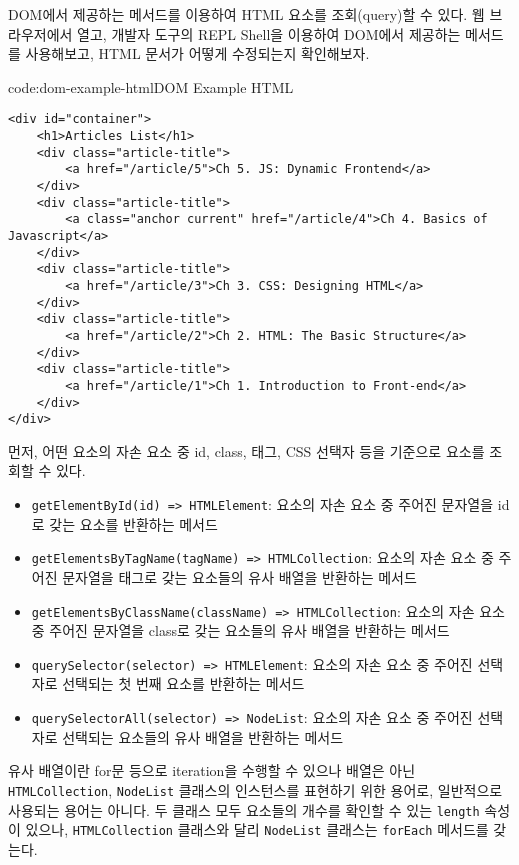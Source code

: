 DOM에서 제공하는 메서드를 이용하여 HTML 요소를 조회(query)할 수 있다. \을 웹 브라우저에서 열고, 개발자 도구의 REPL Shell을 이용하여 DOM에서 제공하는 메서드를 사용해보고, HTML 문서가 어떻게 수정되는지 확인해보자.

\begin{codeenv}{code:dom-example-html}{DOM Example HTML}\begin{verbatim}
<div id="container">
    <h1>Articles List</h1>
    <div class="article-title">
        <a href="/article/5">Ch 5. JS: Dynamic Frontend</a>
    </div>
    <div class="article-title">
        <a class="anchor current" href="/article/4">Ch 4. Basics of Javascript</a>
    </div>
    <div class="article-title">
        <a href="/article/3">Ch 3. CSS: Designing HTML</a>
    </div>
    <div class="article-title">
        <a href="/article/2">Ch 2. HTML: The Basic Structure</a>
    </div>
    <div class="article-title">
        <a href="/article/1">Ch 1. Introduction to Front-end</a>
    </div>
</div>
\end{verbatim}
\end{codeenv}

먼저, 어떤 요소의 자손 요소 중 id, class, 태그, CSS 선택자 등을 기준으로 요소를 조회할 수 있다.

\begin{itemize}
    \item \texttt{getElementById(id) => HTMLElement}: 요소의 자손 요소 중 주어진 문자열을 id로 갖는 요소를 반환하는 메서드
    \item \texttt{getElementsByTagName(tagName) => HTMLCollection}: 요소의 자손 요소 중 주어진 문자열을 태그로 갖는 요소들의 유사 배열을 반환하는 메서드
    \item \texttt{getElementsByClassName(className) => HTMLCollection}: 요소의 자손 요소 중 주어진 문자열을 class로 갖는 요소들의 유사 배열을 반환하는 메서드
    \item \texttt{querySelector(selector) => HTMLElement}: 요소의 자손 요소 중 주어진 선택자로 선택되는 첫 번째 요소를 반환하는 메서드
    \item \texttt{querySelectorAll(selector) => NodeList}: 요소의 자손 요소 중 주어진 선택자로 선택되는 요소들의 유사 배열을 반환하는 메서드
\end{itemize}

유사 배열이란 for문 등으로 iteration을 수행할 수 있으나 배열은 아닌 \texttt{HTMLCollection}, \texttt{NodeList} 클래스의 인스턴스를 표현하기 위한 용어로, 일반적으로 사용되는 용어는 아니다. 두 클래스 모두 요소들의 개수를 확인할 수 있는 \texttt{length} 속성이 있으나, \texttt{HTMLCollection} 클래스와 달리 \texttt{NodeList} 클래스는 \texttt{forEach} 메서드를 갖는다.

